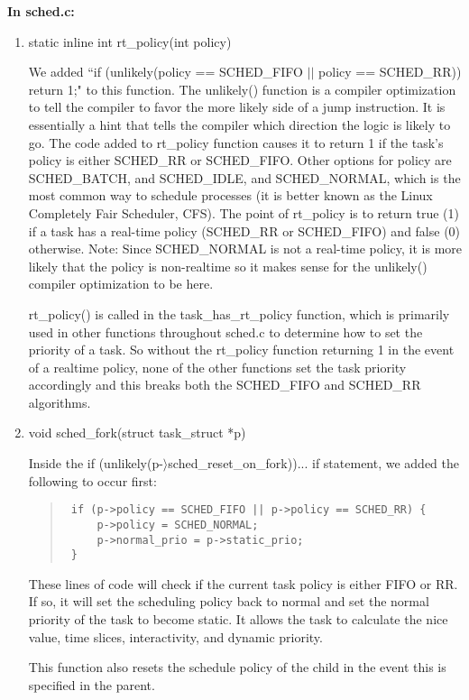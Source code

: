 \documentclass[letterpaper,10pt,titlepage]{article}
\begin{document}
{\bfseries In sched.c:}
\begin{enumerate}
    \item static inline int rt\_policy(int policy)

        We added ``if (unlikely(policy == SCHED\_FIFO $||$ policy == SCHED\_RR)) return 1;" to this function. The unlikely() function is a compiler optimization to tell the compiler to favor the more likely side of a jump instruction. It is essentially a hint that tells the compiler which direction the logic is likely to go. The code added to rt\_policy function causes it to return 1 if the task's policy is either SCHED\_RR or SCHED\_FIFO. Other options for policy are SCHED\_BATCH, and SCHED\_IDLE, and SCHED\_NORMAL, which is the most common way to schedule processes (it is better known as the Linux Completely Fair Scheduler, CFS). The point of rt\_policy is to return true (1) if a task has a real-time policy (SCHED\_RR or SCHED\_FIFO) and false (0) otherwise. Note: Since SCHED\_NORMAL is not a real-time policy, it is more likely that the policy is non-realtime so it makes sense for the unlikely() compiler optimization to be here. 
        
        rt\_policy() is called in the task\_has\_rt\_policy function, which is primarily used in other functions throughout sched.c to determine how to set the priority of a task. So without the rt\_policy function returning 1 in the event of a realtime policy, none of the other functions set the task priority accordingly and this breaks both the SCHED\_FIFO and SCHED\_RR algorithms.

\newpage
\item void sched\_fork(struct task\_struct *p)

Inside the if (unlikely(p-$\rangle$sched\_reset\_on\_fork)){...} if statement, we added the following to occur first:
\begin{quotation}
\begin{verbatim}
 if (p->policy == SCHED_FIFO || p->policy == SCHED_RR) {
     p->policy = SCHED_NORMAL;
     p->normal_prio = p->static_prio;
 }
\end{verbatim}
\end{quotation}
These lines of code will check if the current task policy is either FIFO or RR. If so, it will set the scheduling policy back to normal and set the normal priority of the task to become static. It allows the task to calculate the nice value, time slices, interactivity, and dynamic priority.

This function also resets the schedule policy of the child in the event this is specified in the parent.



\end{enumerate}
\end{document}

